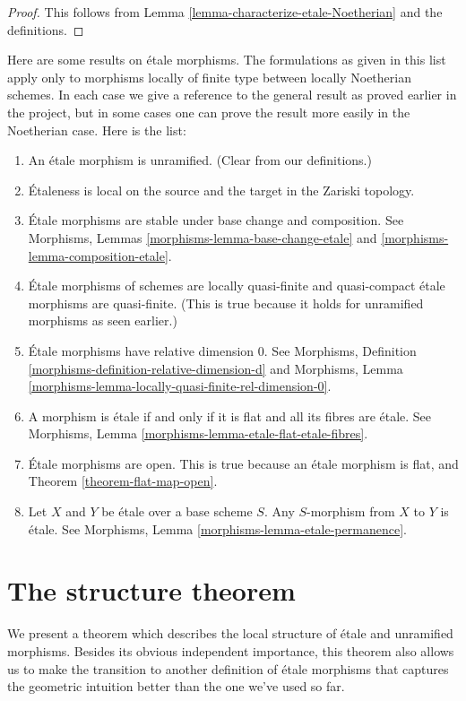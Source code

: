 \documentclass{stacks-project}
\theoremstyle{plain}
\theoremstyle{definition}
\theoremstyle{remark}
\numberwithin{equation}{subsection}
\begin{document}
\begin{proof}
This follows from Lemma \ref{lemma-characterize-etale-Noetherian}
and the definitions.
\end{proof}

\noindent
Here are some results on \'etale morphisms.
The formulations as given in this list apply only to
morphisms locally of finite type between locally Noetherian schemes.
In each case we give a reference to the general result as
proved earlier in the project, but in some cases one can
prove the result more easily in the Noetherian case.
Here is the list:
\begin{enumerate}
\item An \'etale morphism is unramified. (Clear from our definitions.)
\item \'Etaleness is local on the source and the target in the Zariski
topology.
\item \'Etale morphisms are stable under base change and composition.
See Morphisms, Lemmas \ref{morphisms-lemma-base-change-etale}
and \ref{morphisms-lemma-composition-etale}.
\item \'Etale morphisms of schemes are locally quasi-finite
and quasi-compact \'etale morphisms are quasi-finite. (This is
true because it holds for unramified morphisms as seen earlier.)
\item \'Etale morphisms have relative dimension $0$. See
Morphisms, Definition \ref{morphisms-definition-relative-dimension-d}
and
Morphisms, Lemma \ref{morphisms-lemma-locally-quasi-finite-rel-dimension-0}.
\item A morphism is \'etale if and only if it is flat and
all its fibres are \'etale. See
Morphisms, Lemma \ref{morphisms-lemma-etale-flat-etale-fibres}.
\item \'Etale morphisms are open. This is true because an \'etale
morphism is flat, and Theorem \ref{theorem-flat-map-open}.
\item Let $X$ and $Y$ be \'etale over a base scheme $S$.
Any $S$-morphism from $X$ to $Y$ is \'etale.
See Morphisms, Lemma \ref{morphisms-lemma-etale-permanence}.
\end{enumerate}






\section{The structure theorem}
\label{section-structure-etale-map}

\noindent
We present a theorem which describes the local structure of \'etale
and unramified morphisms. Besides its obvious independent importance,
this theorem also allows us to make the transition to another
definition of \'etale morphisms that captures the geometric intuition better
than the one we've used so far.
\end{document}

